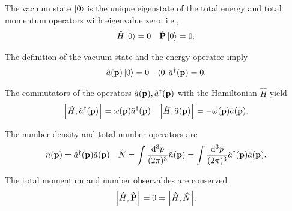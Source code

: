 \begin{definition}\label{def:vacuum_state}
	The vacuum state $\ket{0}$ is the unique eigenstate of the total energy and total momentum operators with eigenvalue zero, i.e.,
	\begin{align}
		\hat{H}
		\ket{0}
		=
		0
		&&
		\hat{\vb{P}}
		\ket{0}
		=
		0
		.
	\end{align}
\end{definition}
\begin{corollary}\label{thm:vacuum_state_ac}
	The definition of the vacuum state and the energy operator imply
	\begin{align}
		\hat{a}(\vb{p})
		\ket{0}
		=
		0
		&&
		\bra{0}
		\hat{a}^\dagger(\vb{p})
		=
		0
		.
	\end{align}
\end{corollary}
\begin{corollary}
	The commutators of the operators $\hat{a}(\vb{p}),\hat{a}^\dagger(\vb{p})$ with the Hamiltonian $\hat{H}$ yield
	\begin{align}
		\comm{\hat{H}}{\hat{a}^\dagger(\vb{p})}
		=
		\omega(\vb{p})
		\hat{a}^\dagger(\vb{p})
		&&
		\comm{\hat{H}}{\hat{a}(\vb{p})}
		=
		-
		\omega(\vb{p})
		\hat{a}(\vb{p})
		.
	\end{align}
\end{corollary}
\begin{definition}
	The number density and total number operators are
	\begin{align}
		\hat{n}(\vb{p})
		=
		\hat{a}^\dagger(\vb{p})
		\hat{a}(\vb{p})
		&&
		\hat{N}
		=
		\int\frac{\dd[3]{p}}{(2\pi)^3}
		\hat{n}(\vb{p})
		=
		\int\frac{\dd[3]{p}}{(2\pi)^3}
		\hat{a}^\dagger(\vb{p})
		\hat{a}(\vb{p})
		.
	\end{align}
\end{definition}
\begin{corollary}
	The total momentum and number observables are conserved
	\begin{equation}
		\comm{\hat{H}}{\hat{\vb{P}}}
		=
		0
		=
		\comm{\hat{H}}{\hat{N}}
		.
	\end{equation}
\end{corollary}

